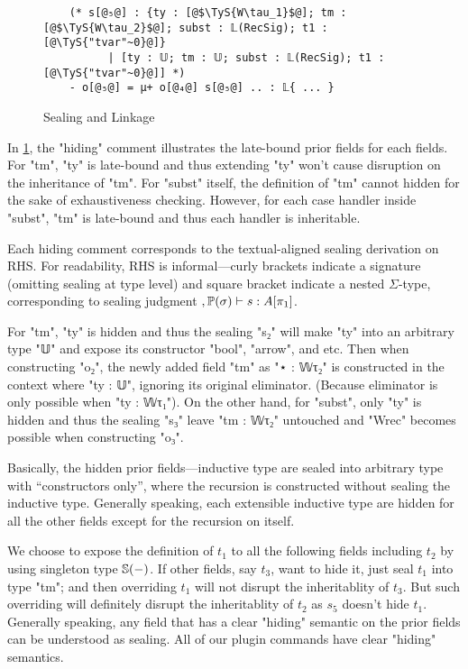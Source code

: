 \begin{figure}[!htb]
\begin{minipage}{\textwidth}
\begin{multicols}{3}
\begin{lstlisting}
    (* s[@₅@] : {ty : [@$\TyS{W\tau_1}$@]; tm : [@$\TyS{W\tau_2}$@]; subst : 𝕃(RecSig); t1 : [@\TyS{"tvar"~0}@]} 
          | [ty : 𝕌; tm : 𝕌; subst : 𝕃(RecSig); t1 : [@\TyS{"tvar"~0}@]] *)
    - o[@₅@] = μ+ o[@₄@] s[@₅@] .. : 𝕃{ ... }
  \end{lstlisting}
  
  \columnbreak
  

  
  \end{multicols}
  \end{minipage}
  \caption{Sealing and Linkage}\label{fig:sealing+linkage}
  \end{figure}



In \cref{fig:sealing+linkage}, the "hiding" comment illustrates the late-bound prior fields for each fields.   For "tm", "ty" is late-bound and thus extending "ty" won't cause disruption on the inheritance of "tm". For "subst" itself, the definition of "tm"  cannot hidden for the sake of exhaustiveness checking. However, for each case handler inside "subst", "tm" is late-bound and thus each handler is inheritable. 

Each hiding comment corresponds to the textual-aligned sealing derivation on RHS. For readability, RHS is informal---curly brackets indicate a signature (omitting sealing at type level) and square bracket indicate a nested $\Sigma$-type, corresponding to sealing judgment $  {{}, \mathbb{P}({\sigma})} \vdash {{s}} : {{{A}}\!\left[{\pi_1}\right]}  $.

For "tm", "ty" is hidden and thus the sealing "s₂" will make "ty" into an arbitrary type "𝕌" and expose its constructor "bool", "arrow", and etc. Then when constructing "o₂", the newly added field "tm" as "⋆ : 𝕎τ₂" is constructed in the context where "ty : 𝕌", ignoring its original eliminator. (Because eliminator is only possible when "ty : 𝕎τ₁"). On the other hand, for "subst", only "ty" is hidden and thus the sealing "s₃" leave "tm : 𝕎τ₂" untouched and "Wrec" becomes possible when constructing "o₃".

Basically, the hidden prior fields---inductive type are sealed into arbitrary type with ``constructors only'', where the recursion is constructed without sealing the inductive type.  Generally speaking, each extensible inductive type are hidden for all the other fields except for the recursion on itself. 

We choose to expose the definition of $t_1$ to all the following fields including $t_2$ by using singleton type $\mathbb{S}({-})$. If other fields, say $t_3$, want to hide it, just seal $t_1$ into type "tm"; and then overriding $t_1$ will not disrupt the inheritablity of $t_3$. But such overriding will definitely disrupt the inheritablity of $t_2$ as $s_5$ doesn't hide $t_1$. Generally speaking, any field that has a clear "hiding" semantic on the prior fields can be understood as sealing. All of our plugin commands have clear "hiding" semantics.

